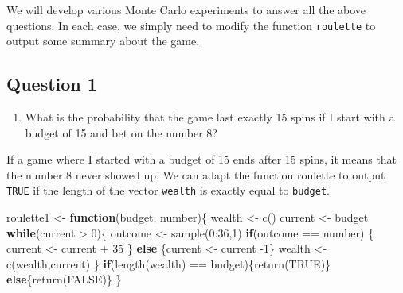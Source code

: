 \documentclass[
]{book}
\newenvironment{Shaded}{\begin{snugshade}}{\end{snugshade}}
\newcommand{\ConstantTok}[1]{\textcolor[rgb]{0.00,0.00,0.00}{#1}}
\newcommand{\ControlFlowTok}[1]{\textcolor[rgb]{0.13,0.29,0.53}{\textbf{#1}}}
\newcommand{\DecValTok}[1]{\textcolor[rgb]{0.00,0.00,0.81}{#1}}
\newcommand{\FunctionTok}[1]{\textcolor[rgb]{0.00,0.00,0.00}{#1}}
\newcommand{\NormalTok}[1]{#1}
\newcommand{\OtherTok}[1]{\textcolor[rgb]{0.56,0.35,0.01}{#1}}
\newcommand{\SpecialCharTok}[1]{\textcolor[rgb]{0.00,0.00,0.00}{#1}}
\providecommand{\tightlist}{%
  \setlength{\itemsep}{0pt}\setlength{\parskip}{0pt}}
\begin{document}
We will develop various Monte Carlo experiments to answer all the above questions. In each case, we simply need to modify the function \texttt{roulette} to output some summary about the game.

\hypertarget{question-1}{%
\subsection{Question 1}\label{question-1}}

\begin{enumerate}
\def\labelenumi{\arabic{enumi}.}
\tightlist
\item
  What is the probability that the game last exactly 15 spins if I start with a budget of 15 and bet on the number 8?
\end{enumerate}

If a game where I started with a budget of 15 ends after 15 spins, it means that the number 8 never showed up. We can adapt the function roulette to output \texttt{TRUE} if the length of the vector \texttt{wealth} is exactly equal to \texttt{budget}.

\begin{Shaded}
\begin{Highlighting}[]
\NormalTok{roulette1 }\OtherTok{\textless{}{-}} \ControlFlowTok{function}\NormalTok{(budget, number)\{}
\NormalTok{  wealth }\OtherTok{\textless{}{-}} \FunctionTok{c}\NormalTok{()}
\NormalTok{  current }\OtherTok{\textless{}{-}}\NormalTok{ budget}
  \ControlFlowTok{while}\NormalTok{(current }\SpecialCharTok{\textgreater{}} \DecValTok{0}\NormalTok{)\{}
\NormalTok{    outcome }\OtherTok{\textless{}{-}} \FunctionTok{sample}\NormalTok{(}\DecValTok{0}\SpecialCharTok{:}\DecValTok{36}\NormalTok{,}\DecValTok{1}\NormalTok{)}
    \ControlFlowTok{if}\NormalTok{(outcome }\SpecialCharTok{==}\NormalTok{ number) \{}
\NormalTok{      current }\OtherTok{\textless{}{-}}\NormalTok{ current }\SpecialCharTok{+} \DecValTok{35}
\NormalTok{    \}}
    \ControlFlowTok{else}\NormalTok{ \{current }\OtherTok{\textless{}{-}}\NormalTok{ current }\SpecialCharTok{{-}}\DecValTok{1}\NormalTok{\}}
\NormalTok{    wealth }\OtherTok{\textless{}{-}} \FunctionTok{c}\NormalTok{(wealth,current)}
\NormalTok{  \}}
  \ControlFlowTok{if}\NormalTok{(}\FunctionTok{length}\NormalTok{(wealth) }\SpecialCharTok{==}\NormalTok{ budget)\{}\FunctionTok{return}\NormalTok{(}\ConstantTok{TRUE}\NormalTok{)\} }\ControlFlowTok{else}\NormalTok{\{}\FunctionTok{return}\NormalTok{(}\ConstantTok{FALSE}\NormalTok{)\}}
\NormalTok{\}}
\end{Highlighting}
\end{Shaded}
\end{document}
